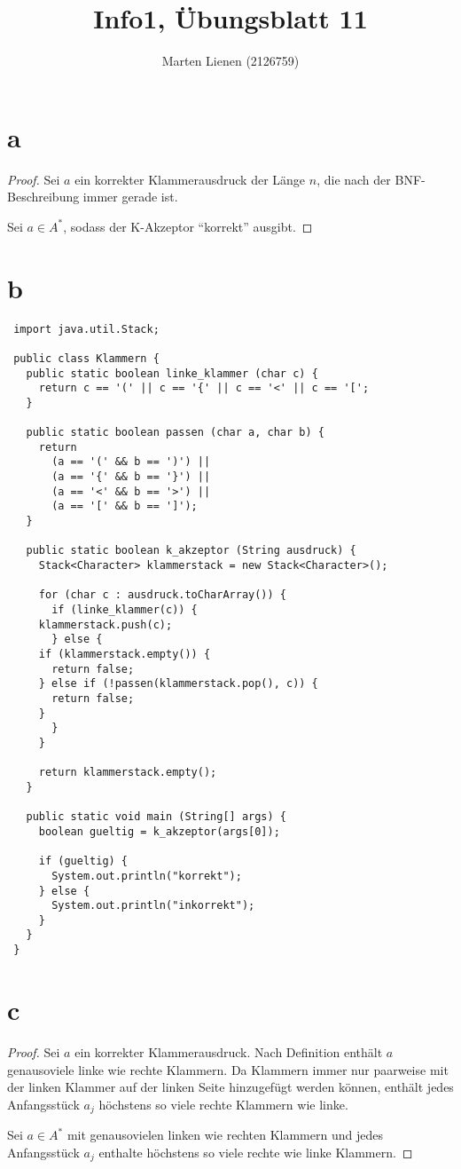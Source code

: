 \documentclass[a4paper,10pt]{article}
\title{Info1, Übungsblatt 11}
\author{Marten Lienen (2126759)}
\begin{document}
\maketitle

\section*{a}

\begin{proof}
 Sei $a$ ein korrekter Klammerausdruck der Länge $n$, die nach der BNF-Beschreibung immer gerade ist.	
 
 Sei $a \in A^*$, sodass der K-Akzeptor ``korrekt'' ausgibt.
\end{proof}

\section*{b}

\begin{lstlisting}
 import java.util.Stack;

 public class Klammern {
   public static boolean linke_klammer (char c) {
     return c == '(' || c == '{' || c == '<' || c == '[';
   }

   public static boolean passen (char a, char b) {
     return
       (a == '(' && b == ')') ||
       (a == '{' && b == '}') ||
       (a == '<' && b == '>') ||
       (a == '[' && b == ']');
   }

   public static boolean k_akzeptor (String ausdruck) {
     Stack<Character> klammerstack = new Stack<Character>();

     for (char c : ausdruck.toCharArray()) {
       if (linke_klammer(c)) {
	 klammerstack.push(c);
       } else {
	 if (klammerstack.empty()) {
	   return false;
	 } else if (!passen(klammerstack.pop(), c)) {
	   return false;
	 }
       }
     }

     return klammerstack.empty();
   }

   public static void main (String[] args) {
     boolean gueltig = k_akzeptor(args[0]);

     if (gueltig) {
       System.out.println("korrekt");
     } else {
       System.out.println("inkorrekt");
     }
   }
 }
\end{lstlisting}

\section*{c}

\begin{proof}
 Sei $a$ ein korrekter Klammerausdruck.
 Nach Definition enthält $a$ genausoviele linke wie rechte Klammern.
 Da Klammern immer nur paarweise mit der linken Klammer auf der linken Seite hinzugefügt werden können, enthält jedes Anfangsstück $a_j$ höchstens so viele rechte Klammern wie linke.
 
 Sei $a \in A^*$ mit genausovielen linken wie rechten Klammern und jedes Anfangsstück $a_j$ enthalte höchstens so viele rechte wie linke Klammern. 
\end{proof}
\end{document}
